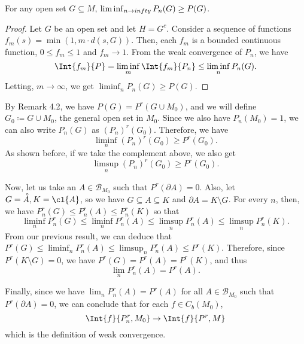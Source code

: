 \documentclass[12pt,letterpaper,twoside]{hmcpset}
\begin{document}
\begin{solution}
  \begin{lem}
    \label{lem:1}
    For any open set $G \subseteq M$, $\liminf_{n\to\\infty}P_n(G) \geq P(G)$.
  \end{lem}
  \begin{proof}
    Let $G$ be an open set and let $H = G^c$.
    Consider a sequence of functions $f_m(s) = \min(1,m\cdot d(s,G))$.
    Then, each $f_m$ is a bounded continuous function, $0 \leq f_m \leq 1$ and $f_m \to 1$.
    From the weak convergence of $P_n$, we have \[
    \Int{f_m}{P} = \liminf_m \Int{f_m}{P_n} \leq \liminf_n P_n(G).
    \]
    Letting, $m\to\infty$, we get $\liminf_n P_n(G) \geq P(G)$.
  \end{proof}
  
  By Remark 4.2, we have $P(G) = P^r(G \cup M_0)$, and we will define $G_0 \coloneqq G \cup M_0$, the general open set in $M_0$.
  Since we also have $P_n(M_0) = 1$, we can also write $P_n(G)$ as $(P_n)^r(G_0)$.
  Therefore, we have \[
  \liminf_n (P_n)^r(G_0) \geq P^r(G_0).
  \]
  As shown before, if we take the complement above, we also get \[
  \limsup_n (P_n)^r(G_0) \geq P^r(G_0).
  \]
  
  Now, let us take an $A \in \mathcal{B}_{M_0}$ such that $P^r(\partial A) = 0$.
  Also, let $G = \accentset{\circ}{A}, K = \cl{A}$, so we have $G \subseteq A \subseteq K$ and $\partial A = K \setminus G$.
  For every $n$, then, we have $P_n^r(G) \leq P_n^r(A) \leq P_n^r(K)$ so that \[
  \liminf_n P_n^r(G) \leq \liminf_n P_n^r(A) \leq \limsup_n P_n^r(A) \leq \limsup_n P_n^r(K).
  \]
  From our previous result, we can deduce that $P^r(G) \leq \liminf_n P_n^r(A) \leq \limsup_n P_n^r(A) \leq P^r(K)$.
  Therefore, since $P^r(K\setminus G) = 0$, we have $P^r(G) = P^r(A) = P^r(K)$, and thus \[
  \lim_n P_n^r(A) = P^r(A).
  \]
  
  Finally, since we have $\lim_n P_n^r(A) = P^r(A)$ for all $A \in \mathcal{B}_{M_0}$ such that $P^r(\partial A) = 0$, we can conclude that for each $f \in C_b(M_0)$, \[
  \Int{f}{P_n^r,M_0} \to \Int{f}{P^r,M}
  \]
  which is the definition of weak convergence.
\end{solution}
\end{document}
